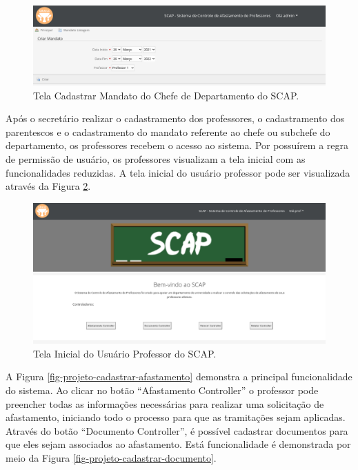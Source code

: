 \begin{figure}[h]
	\centering
	\includegraphics[scale=0.33]{figuras/fig-projeto-cadastrar-mandato} 
	\caption{Tela Cadastrar Mandato do Chefe de Departamento do SCAP.}
	\label{fig-projeto-cadastrar-mandato}
\end{figure}

Após o secretário realizar o cadastramento dos professores, o cadastramento dos parentescos e o cadastramento do mandato referente ao chefe ou subchefe do departamento, os professores recebem o acesso ao sistema. Por possuírem a regra de permissão de usuário, os professores visualizam a tela inicial com as funcionalidades reduzidas. A tela inicial do usuário professor pode ser visualizada através da Figura \ref{fig-projeto-usuario-professor}. 

\begin{figure}[h]
	\centering
	\includegraphics[scale=0.33]{figuras/fig-projeto-usuario-professor} 
	\caption{Tela Inicial do Usuário Professor do SCAP.}
	\label{fig-projeto-usuario-professor}
\end{figure}

A Figura \ref{fig-projeto-cadastrar-afastamento} demonstra a principal funcionalidade do sistema. Ao clicar no botão ``Afastamento Controller'' o professor pode preencher todas as informações necessárias para realizar uma solicitação de afastamento, iniciando todo o processo para que as tramitações sejam aplicadas. Através do botão ``Documento Controller'', é possível cadastrar documentos para que eles sejam associados ao afastamento. Está funcionalidade é demonstrada por meio da Figura \ref{fig-projeto-cadastrar-documento}.   

